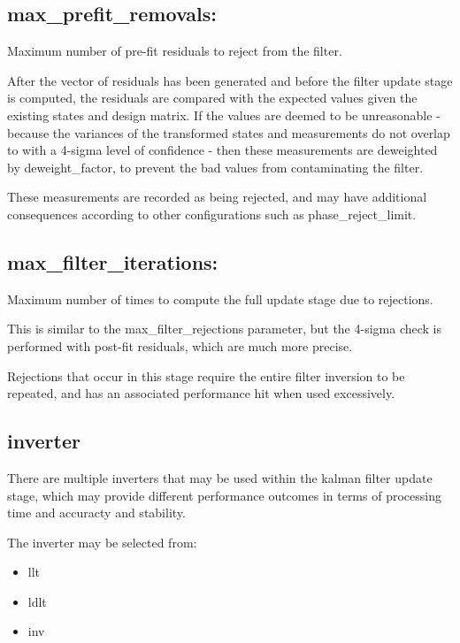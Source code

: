 \subsection*{max\_prefit\_removals:}

Maximum number of pre-fit residuals to reject from the filter.

After the vector of residuals has been generated and before the filter update stage is computed, the residuals are compared with the expected values given the existing states and design matrix.
If the values are deemed to be unreasonable - because the variances of the transformed states and measurements do not overlap to with a 4-sigma level of confidence - then these measurements are deweighted by deweight\_factor, to prevent the bad values from contaminating the filter.

These measurements are recorded as being rejected, and may have additional consequences according to other configurations such as phase\_reject\_limit.

\subsection*{max\_filter\_iterations:}

Maximum number of times to compute the full update stage due to rejections.

This is similar to the max\_filter\_rejections parameter, but the 4-sigma check is performed with post-fit residuals, which are much more precise.

Rejections that occur in this stage require the entire filter inversion to be repeated, and has an associated performance hit when used excessively.


\subsection*{inverter}

There are multiple inverters that may be used within the kalman filter update stage, which may provide different performance outcomes in terms of processing time and accuracty and stability.

The inverter may be selected from:
\begin{itemize}
\item llt
\item ldlt
\item inv
\end {itemize}




